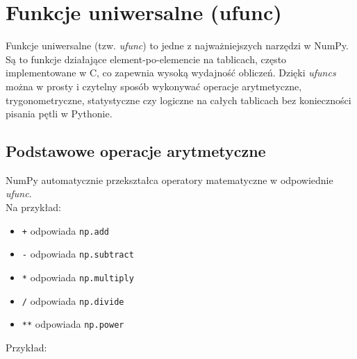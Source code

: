 \documentclass[
  polish,
  letterpaper,
  DIV=11,
  numbers=noendperiod]{scrreprt}
\providecommand{\tightlist}{%
  \setlength{\itemsep}{0pt}\setlength{\parskip}{0pt}}
\begin{document}
\chapter{Funkcje uniwersalne (ufunc)}\label{funkcje-uniwersalne-ufunc}

Funkcje uniwersalne (tzw. \emph{ufunc}) to jedne z najważniejszych
narzędzi w NumPy. Są to funkcje działające element-po-elemencie na
tablicach, często implementowane w C, co zapewnia wysoką wydajność
obliczeń. Dzięki \emph{ufuncs} można w prosty i czytelny sposób
wykonywać operacje arytmetyczne, trygonometryczne, statystyczne czy
logiczne na całych tablicach bez konieczności pisania pętli w Pythonie.

\section{Podstawowe operacje
arytmetyczne}\label{podstawowe-operacje-arytmetyczne}

NumPy automatycznie przekształca operatory matematyczne w odpowiednie
\emph{ufunc}.\\
Na przykład:

\begin{itemize}
\tightlist
\item
  \texttt{+} odpowiada \texttt{np.add}
\item
  \texttt{-} odpowiada \texttt{np.subtract}
\item
  \texttt{*} odpowiada \texttt{np.multiply}
\item
  \texttt{/} odpowiada \texttt{np.divide}
\item
  \texttt{**} odpowiada \texttt{np.power}
\end{itemize}

Przykład:
\end{document}
